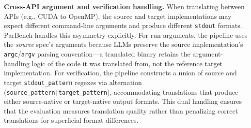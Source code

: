 \documentclass{article}
\begin{document}

\textbf{Cross-API argument and verification handling.} When translating between APIs (e.g., CUDA to OpenMP), the source and target implementations may expect different command-line arguments and produce different \texttt{stdout} formats. ParBench handles this asymmetry explicitly. For run arguments, the pipeline uses the \emph{source} spec's arguments because LLMs preserve the source implementation's \texttt{argc}/\texttt{argv} parsing convention---a translated binary retains the argument-handling logic of the code it was translated from, not the reference target implementation. For verification, the pipeline constructs a union of source and target \texttt{stdout\_pattern} regexes via alternation (\texttt{source\_pattern|target\_pattern}), accommodating translations that produce either source-native or target-native output formats. This dual handling ensures that the evaluation measures translation quality rather than penalizing correct translations for superficial format differences.
\end{document}
